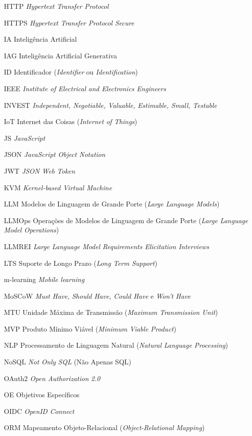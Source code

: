 \begin{siglas}
  \item[HTTP] \textit{Hypertext Transfer Protocol}
  \item[HTTPS] \textit{Hypertext Transfer Protocol Secure}
  \item[IA] Inteligência Artificial
  \item[IAG] Inteligência Artificial Generativa
  \item[ID] Identificador (\textit{Identifier} ou \textit{Identification})
  \item[IEEE] \textit{Institute of Electrical and Electronics Engineers}
  \item[INVEST] \textit{Independent, Negotiable, Valuable, Estimable, Small, Testable}
  \item[IoT] Internet das Coisas (\textit{Internet of Things})
  \item[JS] \textit{JavaScript}
  \item[JSON] \textit{JavaScript Object Notation}
  \item[JWT] \textit{JSON Web Token}
  \item[KVM] \textit{Kernel-based Virtual Machine}
  \item[LLM] Modelos de Linguagem de Grande Porte (\textit{Large Language Models})
  \item[LLMOps] Operações de Modelos de Linguagem de Grande Porte (\textit{Large Language Model Operations})
  \item[LLMREI] \textit{Large Language Model Requirements Elicitation Interviews}
  \item[LTS] Suporte de Longo Prazo (\textit{Long Term Support})
  \item[m-learning] \textit{Mobile learning}
  \item[MoSCoW] \textit{Must Have, Should Have, Could Have} e \textit{Won't Have}
  \item[MTU] Unidade Máxima de Transmissão (\textit{Maximum Transmission Unit})
  \item[MVP] Produto Mínimo Viável (\textit{Minimum Viable Product})
  \item[NLP] Processamento de Linguagem Natural (\textit{Natural Language Processing})
  \item[NoSQL] \textit{Not Only SQL} (Não Apenas SQL)
  \item[OAuth2] \textit{Open Authorization 2.0}
  \item[OE] Objetivos Específicos
  \item[OIDC] \textit{OpenID Connect}
  \item[ORM] Mapeamento Objeto-Relacional (\textit{Object-Relational Mapping})

\end{siglas}
